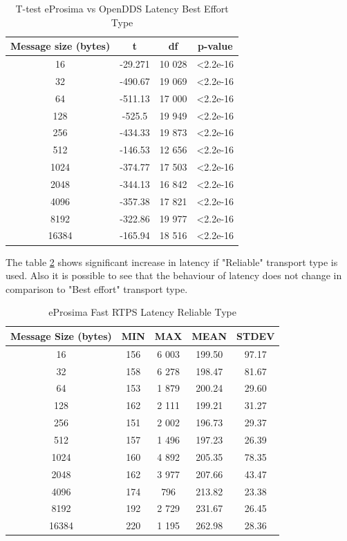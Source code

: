\documentclass{csfourzero}
\begin{document}
\begin{table}[!ht]
	\centering
	\caption{T-test eProsima vs OpenDDS Latency Best Effort Type}
	\label{T-test-latency-table-best}
	\begin{tabular}{|c|c|c|c|}
		\hline 
		 Message size (bytes) & t & df & p-value \\ 
		\hline 
		16 & -29.271 & 10 028 & \textless 2.2e-16 \\ 
		\hline 
		32 & -490.67 & 19 069 & \textless 2.2e-16 \\ 
		\hline 
		64 & -511.13 & 17 000 & \textless 2.2e-16 \\ 
		\hline 
		128 & -525.5 & 19 949 & \textless 2.2e-16 \\ 
		\hline 
		256 & -434.33 & 19 873 & \textless 2.2e-16 \\ 
		\hline 
		512 & -146.53 & 12 656 & \textless 2.2e-16 \\ 
		\hline 
		1024 & -374.77 & 17 503 & \textless 2.2e-16 \\ 
		\hline 
		2048 & -344.13 & 16 842 & \textless 2.2e-16 \\ 
		\hline 
		4096 & -357.38 & 17 821 & \textless 2.2e-16 \\ 
		\hline 
		8192 & -322.86 & 19 977 & \textless 2.2e-16 \\ 
		\hline 
		16384 & -165.94 & 18 516 & \textless 2.2e-16 \\ 
		\hline 
	\end{tabular} 
\end{table}

The table \ref{eProima-latency-table-reliable} shows significant increase in latency if "Reliable" transport type is used. Also it is possible to see that the behaviour of latency does not change in comparison to "Best effort" transport type.

\begin{table}[!ht]
	\centering
	\caption{eProsima Fast RTPS Latency Reliable Type}
	\label{eProima-latency-table-reliable}
	\begin{tabular}{|c|c|c|c|c|}
		\hline 
		Message Size (bytes)& MIN & MAX & MEAN & STDEV \\ 
		\hline 
		16 & 156 & 6 003 & 199.50 & 97.17 \\ 
		\hline 
		32 & 158 & 6 278 & 198.47 & 81.67 \\ 
		\hline 
		64 & 153 & 1 879 & 200.24 & 29.60 \\ 
		\hline 
		128 & 162 & 2 111 & 199.21 & 31.27 \\ 
		\hline 
		256 & 151 & 2 002 & 196.73 & 29.37 \\ 
		\hline 
		512 & 157 & 1 496 & 197.23 & 26.39 \\ 
		\hline 
		1024 & 160 & 4 892 & 205.35 & 78.35 \\ 
		\hline 
		2048 & 162 & 3 977 & 207.66 & 43.47 \\ 
		\hline 
		4096 & 174 & 796 & 213.82 & 23.38 \\ 
		\hline 
		8192 & 192 & 2 729 & 231.67 & 26.45 \\ 
		\hline 
		16384 & 220 & 1 195 & 262.98 & 28.36 \\ 
		\hline 
	\end{tabular}
\end{table}
\end{document}
